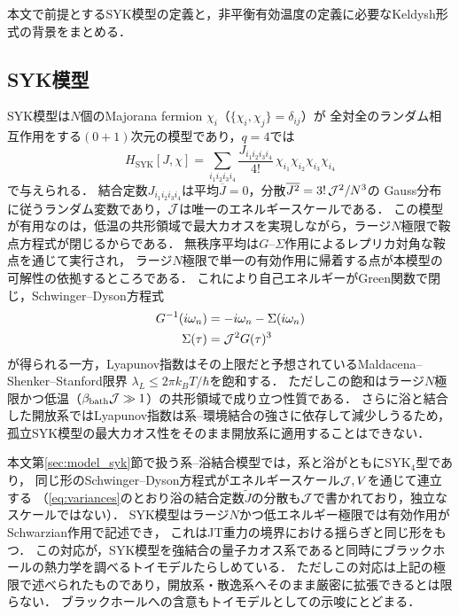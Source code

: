 \documentclass[a4paper,11pt,onecolumn,baselineskip=14.5pt]{jlreq}
\begin{document}
本文で前提とするSYK模型の定義と，非平衡有効温度の定義に必要なKeldysh形式の背景をまとめる．

\subsection{SYK模型}
\label{sec:appendix_syk}

SYK模型は$N$個のMajorana fermion $\chi_i$（$\{\chi_i,\chi_j\}=\delta_{ij}$）が
全対全のランダム相互作用をする$(0+1)$次元の模型であり，$q=4$では
\begin{equation}
  H_{\mathrm{SYK}}[J,\chi]
  = \sum_{i_1 i_2 i_3 i_4}
    \frac{J_{i_1 i_2 i_3 i_4}}{4!}\,
    \chi_{i_1}\chi_{i_2}\chi_{i_3}\chi_{i_4}
  \label{eq:H_syk_pure}
\end{equation}
で与えられる．
結合定数$J_{i_1i_2i_3i_4}$は平均$\overline{J}=0$，分散$\overline{J^2}=3!\,\mathcal{J}^2/N^3$の
Gauss分布に従うランダム変数であり，$\mathcal{J}$は唯一のエネルギースケールである．
この模型が有用なのは，低温の共形領域で最大カオスを実現しながら，ラージ$N$極限で鞍点方程式が閉じるからである\cite{MaldacenaStanford2016}．
無秩序平均は$G$--$\Sigma$作用によるレプリカ対角な鞍点を通じて実行され，
ラージ$N$極限で単一の有効作用に帰着する点が本模型の可解性の依拠するところである．
これにより自己エネルギーがGreen関数で閉じ，Schwinger--Dyson方程式
\begin{equation}
  \begin{split}
    G^{-1}(i\omega_n)
    &= - i\omega_n - \Sigma(i\omega_n) \\
    \Sigma(\tau)
    &= \mathcal{J}^2 G(\tau)^3
  \end{split}
\end{equation}
が得られる一方，Lyapunov指数はその上限だと予想されているMaldacena--Shenker--Stanford限界
$\lambda_L\le 2\pi k_B T/\hbar$を飽和する\cite{Maldacena2016}．
ただしこの飽和はラージ$N$極限かつ低温（$\beta_{\mathrm{bath}}\mathcal{J}\gg1$）の共形領域で成り立つ性質である．
さらに浴と結合した開放系ではLyapunov指数は系--環境結合の強さに依存して減少しうる\cite{Wang2024}ため，
孤立SYK模型の最大カオス性をそのまま開放系に適用することはできない．

本文第\ref{sec:model_syk}節で扱う系--浴結合模型では，系と浴がともにSYK$_4$型であり，
同じ形のSchwinger--Dyson方程式がエネルギースケール$\mathcal{J},V$を通じて連立する
（\eqref{eq:variances}のとおり浴の結合定数$\tilde{J}$の分散も$\mathcal{J}$で書かれており，独立なスケールではない）．
SYK模型はラージ$N$かつ低エネルギー極限では有効作用がSchwarzian作用で記述でき\cite{MaldacenaStanford2016}，
これはJT重力の境界における揺らぎと同じ形をもつ．
この対応が，SYK模型を強結合の量子カオス系であると同時にブラックホールの熱力学を調べるトイモデルたらしめている．
ただしこの対応は上記の極限で述べられたものであり，開放系・散逸系へそのまま厳密に拡張できるとは限らない．
ブラックホールへの含意もトイモデルとしての示唆にとどまる．
\end{document}
